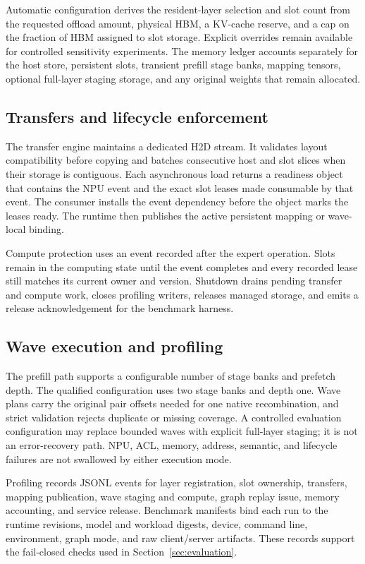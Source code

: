 Automatic configuration derives the resident-layer selection and slot count
from the requested offload amount, physical HBM, a KV-cache reserve, and a cap
on the fraction of HBM assigned to slot storage. Explicit overrides remain
available for controlled sensitivity experiments. The memory ledger accounts
separately for the host store, persistent slots, transient prefill stage banks,
mapping tensors, optional full-layer staging storage, and any original weights
that remain allocated.

\subsection{Transfers and lifecycle enforcement}

The transfer engine maintains a dedicated H2D stream. It validates layout
compatibility before copying and batches consecutive host and slot slices when
their storage is contiguous. Each asynchronous load returns a readiness object
that contains the NPU event and the exact slot leases made consumable by that
event. The consumer installs the event dependency before the object marks the
leases ready. The runtime then publishes the active persistent mapping or
wave-local binding.

Compute protection uses an event recorded after the expert operation. Slots
remain in the computing state until the event completes and every recorded
lease still matches its current owner and version. Shutdown drains pending
transfer and compute work, closes profiling writers, releases managed storage,
and emits a release acknowledgement for the benchmark harness.

\subsection{Wave execution and profiling}

The prefill path supports a configurable number of stage banks and prefetch
depth. The qualified configuration uses two stage banks and depth one. Wave
plans carry the original pair offsets needed for one native recombination, and
strict validation rejects duplicate or missing coverage. A controlled
evaluation configuration may replace bounded waves with explicit full-layer
staging; it is not an error-recovery path. NPU, ACL, memory, address, semantic,
and lifecycle failures are not swallowed by either execution mode.

Profiling records JSONL events for layer registration, slot ownership,
transfers, mapping publication, wave staging and compute, graph replay issue,
memory accounting, and service release. Benchmark manifests bind each run to
the runtime revisions, model and workload digests, device, command line,
environment, graph mode, and raw client/server artifacts. These records support
the fail-closed checks used in Section~\ref{sec:evaluation}.
